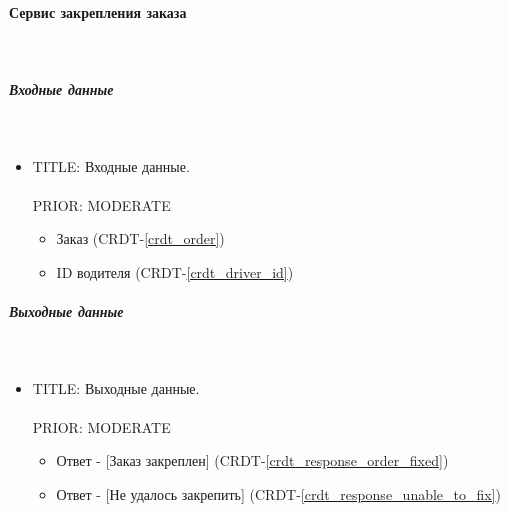 \paragraph{Сервис закрепления заказа} \mbox{} \\ \label{}

	\subparagraph{Входные данные} \mbox{} \\ \label{}

      \begin{itemize}

        \item{

          TITLE: Входные данные.\\
          \\
          PRIOR: MODERATE\\

        }

        \begin{itemize}
          \item Заказ (CRDT-\ref{crdt_order})
          \item ID водителя (CRDT-\ref{crdt_driver_id})
        \end{itemize}

      \end{itemize}

    \subparagraph{Выходные данные} \mbox{} \\

      \begin{itemize}

        \item{

          TITLE: Выходные данные.\\
          \\
          PRIOR: MODERATE\\

        }

        \begin{itemize}
          \item Ответ - [Заказ закреплен] (CRDT-\ref{crdt_response_order_fixed})
          \item Ответ - [Не удалось закрепить] (CRDT-\ref{crdt_response_unable_to_fix})
        \end{itemize}

      \end{itemize}


